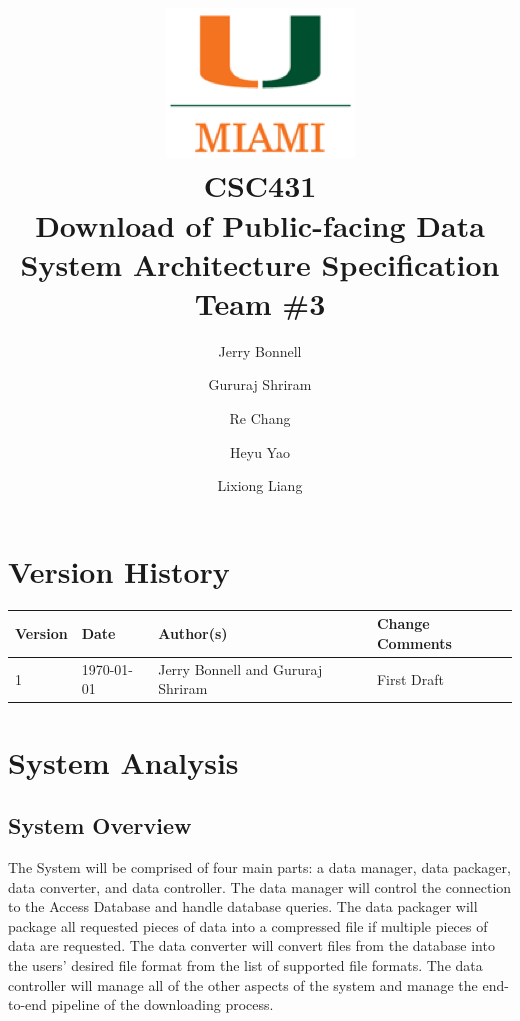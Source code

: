 \documentclass{article}
\begin{document}
\title{
	\includegraphics{images/um_logo.png} \\
	\vspace{0.1in}
	CSC431 \\
	\vspace{0.2in}
	\textbf{Download of Public-facing Data} \\
	\large System Architecture Specification \\
	Team \#3
}

\author{
	Jerry Bonnell
	\and Gururaj Shriram
	\and Re Chang
	\and Heyu Yao
	\and Lixiong Liang
}

\date{}
\maketitle

\clearpage
\section*{Version History}

\begin{tabularx}{\textwidth}{| l | l | X | l |}
	\hline
	\textbf{Version} & \textbf{Date} & \textbf{Author(s)} & \textbf{Change Comments} \\
	\hline
	1 & \today & Jerry Bonnell and Gururaj Shriram & First Draft \\
	\hline
\end{tabularx}

\clearpage
\tableofcontents

\clearpage
\listoffigures
\listoftables

\clearpage

\section{System Analysis}

\subsection{System Overview}

The System will be comprised of four main parts: a data manager, data packager, data converter, and data controller. The data manager will control the connection to the Access Database and handle database queries. The data packager will package all requested pieces of data into a compressed file if multiple pieces of data are requested. The data converter will convert files from the database into the users' desired file format from the list of supported file formats. The data controller will manage all of the other aspects of the system and manage the end-to-end pipeline of the downloading process. \\
\end{document}
